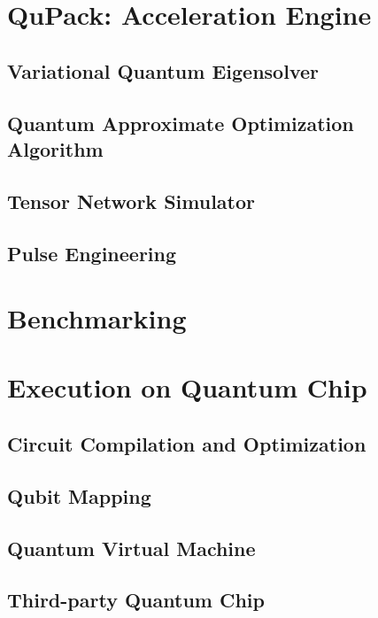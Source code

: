 \documentclass[pra,twocolumn,superscriptaddress,floatfix,nofootinbib,amsmath,amssymb]{revtex4-1}
\begin{document}
\section{QuPack: Acceleration Engine}


\subsection{Variational Quantum Eigensolver}


\subsection{Quantum Approximate Optimization Algorithm}


\subsection{Tensor Network Simulator}


\subsection{Pulse Engineering}



\section{Benchmarking}



\section{Execution on Quantum Chip}

\subsection{Circuit Compilation and Optimization}


\subsection{Qubit Mapping}


\subsection{Quantum Virtual Machine}


\subsection{Third-party Quantum Chip}




\end{document}
